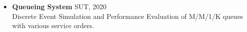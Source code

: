 \documentclass[11pt]{article}
\begin{document}
\begin{itemize}
	
	\item \textbf{Queueing System} \hfill SUT, 2020\\
	Discrete Event Simulation and Performance Evaluation of M/M/1/K queues with various service orders. \href{https://github.com/ImanRHT/MM1K_Queue_Simulation}{\faGithub} 
	




	
	

	
	
\end{itemize}
\end{document}
